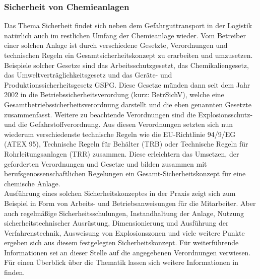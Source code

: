 \subsubsection{Sicherheit von Chemieanlagen}
Das Thema Sicherheit findet sich neben dem Gefahrguttransport in der Logistik natürlich auch im restlichen Umfang der Chemieanlage wieder. 
Vom Betreiber einer solchen Anlage ist durch verschiedene Gesetzte, Verordnungen und technischen Regeln ein Gesamtsicherheitskonzept zu erarbeiten und umzusetzen. Beispiele solcher Gesetze sind das Arbeitsschutzgesetzt, das Chemikaliengesetz, das Umweltverträglichkeitsgesetz und das Geräte- und Produktionssicherheitsgesetz GSPG. \linebreak 
Diese Gesetze münden dann seit dem Jahr 2002 in die Betriebssicherheitsverordung (kurz: BetrSichV), welche eine Gesamtbetriebssicherheitsverordnung darstellt und die eben genannten Gesetzte zusammenfasst. Weitere zu beachtende Verordnungen sind die Explosionsschutz- und die Gefahrstoffverordnung.\linebreak
Aus diesen Verordnungen setzten sich nun wiederum verschiedenste technische Regeln wie die EU-Richtlinie 94/9/EG (ATEX 95), Technische Regeln für Behälter (TRB) oder Technische Regeln für Rohrleitungsanlagen (TRR) zusammen. Diese erleichtern das Umsetzen, der geforderten Verordnungen und Gesetze und bilden zusammen mit berufsgenossenschaftlichen Regelungen ein Gesamt-Sicherheitskonzept für eine chemische Anlage. \cite{Ignatowitz.2015}\\
Ausführung eines solchen Sicherheitskonzeptes in der Praxis zeigt sich zum Beispiel in Form von Arbeits- und Betriebsanweisungen für die Mitarbeiter. Aber auch regelmäßige Sicherheitsschulungen, Instandhaltung der Anlage, Nutzung sicherheitstechnischer Ausrüstung, Dimensionierung und Ausführung der Verfahrenstechnik, Ausweisung von Explosionszonen und viele weitere Punkte ergeben sich aus diesem festgelegten Sicherheitskonzept. Für weiterführende Informationen sei an dieser Stelle auf die angegebenen Verordnungen verwiesen. Für einen Überblick über die Thematik lassen sich weitere Informationen in \cite{Ignatowitz.2015} finden.

